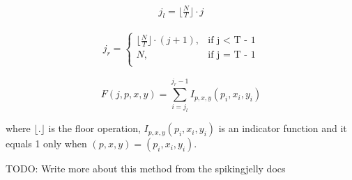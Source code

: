 \begin{align*}
      j_l = \lfloor \frac{N}{T} \rfloor \cdot j
\end{align*}
 
\begin{align*}
      j_r = \begin{cases}
            \lfloor \frac{N}{T} \rfloor \cdot (j + 1), & \text{if j < T - 1}\\
            N, & \text{if j = T - 1}\\
          \end{cases}
\end{align*}

\begin{equation}
      F(j, p, x, y) = \sum^{j_r -1}_{i=j_l}I_{p, x, y}(p_i, x_i, y_i)
      \label{eq:event_integration}
\end{equation}
 
where $ \lfloor . \rfloor $ is the floor operation, $ I_{p, x, y}(p_i, x_i, y_i) $ is an indicator function and it equals 1 only when $ (p, x, y) = (p_i, x_i, y_i) $.

\color{red} TODO: Write more about this method from the spikingjelly docs \color{black}





